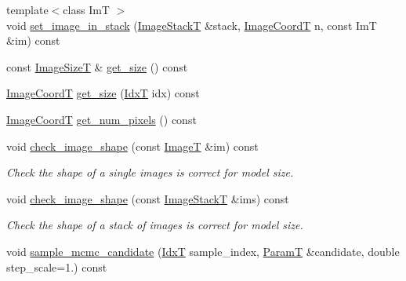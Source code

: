 \begin{DoxyCompactItemize}
\item 
{\footnotesize template$<$class ImT $>$ }\\void \hyperlink{classmappel_1_1ImageFormat2DBase_aaae78a9b02452eb3538af34fcdcc3ad2}{set\+\_\+image\+\_\+in\+\_\+stack} (\hyperlink{classmappel_1_1ImageFormat2DBase_a8f0276e94ff242fa4740a718642f5e14}{Image\+StackT} \&stack, \hyperlink{classmappel_1_1ImageFormat2DBase_a45e9234d63c357f34ca56c72c12b9e9c}{Image\+CoordT} n, const ImT \&im) const 
\item 
const \hyperlink{classmappel_1_1ImageFormat2DBase_a49cccf61eb2a768a202634d27fcd81d5}{Image\+SizeT} \& \hyperlink{classmappel_1_1ImageFormat2DBase_a4497fe096f82ccb3af3c3632921081a5}{get\+\_\+size} () const 
\item 
\hyperlink{classmappel_1_1ImageFormat2DBase_a45e9234d63c357f34ca56c72c12b9e9c}{Image\+CoordT} \hyperlink{classmappel_1_1ImageFormat2DBase_a07ad97af7e697240ee359ae6a4821a2f}{get\+\_\+size} (\hyperlink{namespacemappel_ab17ec0f30b61ece292439d7ece81d3a8}{IdxT} idx) const 
\item 
\hyperlink{classmappel_1_1ImageFormat2DBase_a45e9234d63c357f34ca56c72c12b9e9c}{Image\+CoordT} \hyperlink{classmappel_1_1ImageFormat2DBase_a4f9e0d332462ff53678c03700666a564}{get\+\_\+num\+\_\+pixels} () const 
\item 
void \hyperlink{classmappel_1_1ImageFormat2DBase_aa5f3936c1c0b250fa1df17d53161a991}{check\+\_\+image\+\_\+shape} (const \hyperlink{classmappel_1_1ImageFormat2DBase_a667ea5016648958e507e7db8eaa041b0}{ImageT} \&im) const 
\begin{DoxyCompactList}\small\item\em Check the shape of a single images is correct for model size. \end{DoxyCompactList}\item 
void \hyperlink{classmappel_1_1ImageFormat2DBase_ab40faca8bf94a6e59765da5c3185c19b}{check\+\_\+image\+\_\+shape} (const \hyperlink{classmappel_1_1ImageFormat2DBase_a8f0276e94ff242fa4740a718642f5e14}{Image\+StackT} \&ims) const 
\begin{DoxyCompactList}\small\item\em Check the shape of a stack of images is correct for model size. \end{DoxyCompactList}\item 
void \hyperlink{classmappel_1_1MCMCAdaptor2Ds_a0d9821e431262d6677e814a84f88eb01}{sample\+\_\+mcmc\+\_\+candidate} (\hyperlink{namespacemappel_ab17ec0f30b61ece292439d7ece81d3a8}{IdxT} sample\+\_\+index, \hyperlink{classmappel_1_1PointEmitterModel_a665ec6aea3aac139bb69a23c06d4b9a1}{ParamT} \&candidate, double step\+\_\+scale=1.) const 

\end{DoxyCompactItemize}
